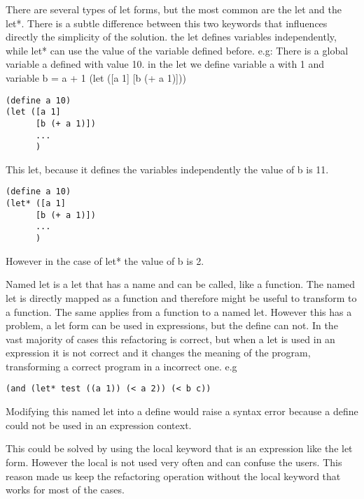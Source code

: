 There are several types of let forms, but the most common are the let and the let*.
There is a subtle difference between this two keywords that influences directly the simplicity of the solution.
the let defines variables independently, while let* can use the value of the variable defined before.
e.g:
There is a global variable a defined with value 10.
in the let we define variable a with 1 and variable b = a + 1
(let ([a 1]
[b (+ a 1)]))

\begin{lstlisting}[basicstyle=\ttfamily, caption="Example"]
(define a 10)
(let ([a 1]
      [b (+ a 1)])
      ...
      )
\end{lstlisting}
This let, because it defines the variables independently the value of b is 11.

\begin{lstlisting}[basicstyle=\ttfamily, caption="Example"]
(define a 10)
(let* ([a 1]
      [b (+ a 1)])
      ...
      )
\end{lstlisting}
However in the case of let* the value of b is 2.


Named let is a let that has a name and can be called, like a function.
The named let is directly mapped as a function and therefore might be useful to transform to a function.
The same applies from a function to a named let.
However this has a problem, a let form can be used in expressions, but the define can not.
In the vast majority of cases this refactoring is correct, but when a let is used in an expression
it is not correct and it changes the meaning of the program, transforming a correct
program in a incorrect one.
e.g
\begin{lstlisting}[basicstyle=\ttfamily, caption="Example"]
(and (let* test ((a 1)) (< a 2)) (< b c))
\end{lstlisting}
Modifying this named let into a define would raise a syntax error because a
define could not be used in an expression context.

This could be solved by using the local keyword that is an expression like
the let form.
However the local is not used very often and can confuse the users. This reason
made us keep the refactoring operation without the local keyword that works for
most of the cases.




